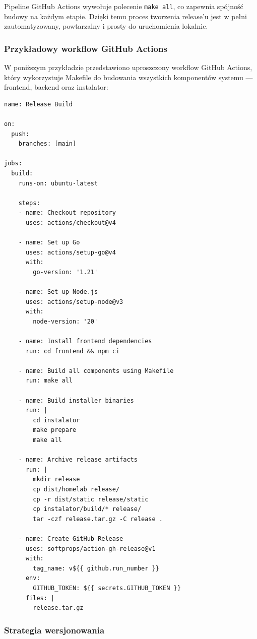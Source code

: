 Pipeline GitHub Actions wywołuje polecenie \texttt{make all}, co zapewnia spójność budowy na każdym etapie. Dzięki temu proces tworzenia release'u jest w pełni zautomatyzowany, powtarzalny i prosty do uruchomienia lokalnie.

\subsubsection{Przykładowy workflow GitHub Actions}

W poniższym przykładzie przedstawiono uproszczony workflow GitHub Actions, który wykorzystuje Makefile do budowania wszystkich komponentów systemu — frontend, backend oraz instalator:

\begin{lstlisting}
name: Release Build

on:
  push:
    branches: [main]

jobs:
  build:
    runs-on: ubuntu-latest

    steps:
    - name: Checkout repository
      uses: actions/checkout@v4

    - name: Set up Go
      uses: actions/setup-go@v4
      with:
        go-version: '1.21'

    - name: Set up Node.js
      uses: actions/setup-node@v3
      with:
        node-version: '20'

    - name: Install frontend dependencies
      run: cd frontend && npm ci

    - name: Build all components using Makefile
      run: make all

    - name: Build installer binaries
      run: |
        cd instalator
        make prepare
        make all

    - name: Archive release artifacts
      run: |
        mkdir release
        cp dist/homelab release/
        cp -r dist/static release/static
        cp instalator/build/* release/
        tar -czf release.tar.gz -C release .

    - name: Create GitHub Release
      uses: softprops/action-gh-release@v1
      with:
        tag_name: v${{ github.run_number }}
      env:
        GITHUB_TOKEN: ${{ secrets.GITHUB_TOKEN }}
      files: |
        release.tar.gz
\end{lstlisting}

\subsubsection{Strategia wersjonowania}

